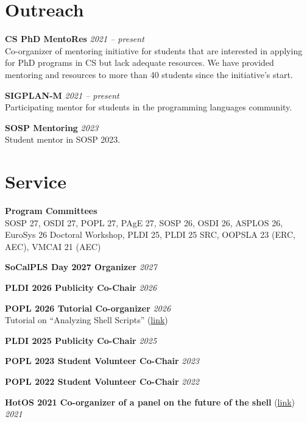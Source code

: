 \documentclass[margin]{res}
\begin{document}
\begin{resume}
\section{Outreach}
\hypertarget{sec:outreach}{}

\textbf{CS PhD MentoRes}  \hfill {\em 2021 -- present} \\
Co-organizer of mentoring initiative for students that are interested in applying for PhD programs in CS but lack adequate resources. We have provided mentoring and resources to more than 40 students since the initiative's start.

\textbf{SIGPLAN-M}  \hfill {\em 2021 -- present} \\
Participating mentor for students in the programming languages community.

\textbf{SOSP Mentoring}  \hfill {\em 2023} \\
Student mentor in SOSP 2023.

\section{Service}
\hypertarget{sec:service}{}

\textbf{Program Committees} \\ %
SOSP 27, OSDI 27, POPL 27, PAgE 27, SOSP 26, OSDI 26, ASPLOS 26, EuroSys 26 Doctoral Workshop, PLDI 25, PLDI 25 SRC, OOPSLA 23 (ERC, AEC), VMCAI 21 (AEC)

\textbf{SoCalPLS Day 2027 Organizer}  \hfill {\em 2027}

\textbf{PLDI 2026 Publicity Co-Chair}  \hfill {\em 2026}

\textbf{POPL 2026 Tutorial Co-organizer} \hfill {\em 2026} \\
Tutorial on ``Analyzing Shell Scripts'' (\href{https://popl26.sigplan.org/details/POPL-2026-tutorials/3/Analyzing-Shell-Scripts}{link})

\textbf{PLDI 2025 Publicity Co-Chair}  \hfill {\em 2025}

\textbf{POPL 2023 Student Volunteer Co-Chair}  \hfill {\em 2023}


\textbf{POPL 2022 Student Volunteer Co-Chair}  \hfill {\em 2022}

\textbf{HotOS 2021 Co-organizer of a panel on the future of the shell} (\href{https://fut-shell.github.io/}{link})  \hfill {\em 2021}


\end{resume}
\end{document}
